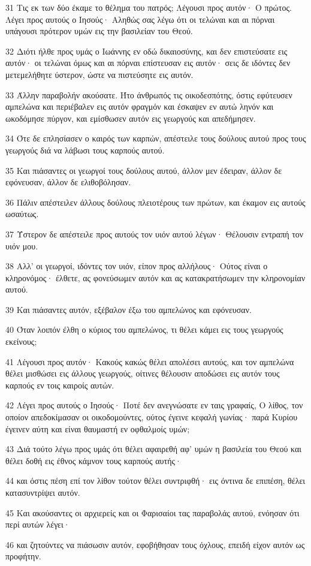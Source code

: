 \par 31 Τις εκ των δύο έκαμε το θέλημα του πατρός; Λέγουσι προς αυτόν· Ο πρώτος. Λέγει προς αυτούς ο Ιησούς· Αληθώς σας λέγω ότι οι τελώναι και αι πόρναι υπάγουσι πρότερον υμών εις την βασιλείαν του Θεού.
\par 32 Διότι ήλθε προς υμάς ο Ιωάννης εν οδώ δικαιοσύνης, και δεν επιστεύσατε εις αυτόν· οι τελώναι όμως και αι πόρναι επίστευσαν εις αυτόν· σεις δε ιδόντες δεν μετεμελήθητε ύστερον, ώστε να πιστεύσητε εις αυτόν.
\par 33 Άλλην παραβολήν ακούσατε. Ήτο άνθρωπός τις οικοδεσπότης, όστις εφύτευσεν αμπελώνα και περιέβαλεν εις αυτόν φραγμόν και έσκαψεν εν αυτώ ληνόν και ωκοδόμησε πύργον, και εμίσθωσεν αυτόν εις γεωργούς και απεδήμησεν.
\par 34 Ότε δε επλησίασεν ο καιρός των καρπών, απέστειλε τους δούλους αυτού προς τους γεωργούς διά να λάβωσι τους καρπούς αυτού.
\par 35 Και πιάσαντες οι γεωργοί τους δούλους αυτού, άλλον μεν έδειραν, άλλον δε εφόνευσαν, άλλον δε ελιθοβόλησαν.
\par 36 Πάλιν απέστειλεν άλλους δούλους πλειοτέρους των πρώτων, και έκαμον εις αυτούς ωσαύτως.
\par 37 Ύστερον δε απέστειλε προς αυτούς τον υιόν αυτού λέγων· Θέλουσιν εντραπή τον υιόν μου.
\par 38 Αλλ' οι γεωργοί, ιδόντες τον υιόν, είπον προς αλλήλους· Ούτος είναι ο κληρονόμος· έλθετε, ας φονεύσωμεν αυτόν και ας κατακρατήσωμεν την κληρονομίαν αυτού.
\par 39 Και πιάσαντες αυτόν, εξέβαλον έξω του αμπελώνος και εφόνευσαν.
\par 40 Όταν λοιπόν έλθη ο κύριος του αμπελώνος, τι θέλει κάμει εις τους γεωργούς εκείνους;
\par 41 Λέγουσι προς αυτόν· Κακούς κακώς θέλει απολέσει αυτούς, και τον αμπελώνα θέλει μισθώσει εις άλλους γεωργούς, οίτινες θέλουσιν αποδώσει εις αυτόν τους καρπούς εν τοις καιροίς αυτών.
\par 42 Λέγει προς αυτούς ο Ιησούς· Ποτέ δεν ανεγνώσατε εν ταις γραφαίς, Ο λίθος, τον οποίον απεδοκίμασαν οι οικοδομούντες, ούτος έγεινε κεφαλή γωνίας· παρά Κυρίου έγεινεν αύτη και είναι θαυμαστή εν οφθαλμοίς υμών;
\par 43 Διά τούτο λέγω προς υμάς ότι θέλει αφαιρεθή αφ' υμών η βασιλεία του Θεού και θέλει δοθή εις έθνος κάμνον τους καρπούς αυτής·
\par 44 και όστις πέση επί τον λίθον τούτον θέλει συντριφθή· εις όντινα δε επιπέση, θέλει κατασυντρίψει αυτόν.
\par 45 Και ακούσαντες οι αρχιερείς και οι Φαρισαίοι τας παραβολάς αυτού, ενόησαν ότι περί αυτών λέγει·
\par 46 και ζητούντες να πιάσωσιν αυτόν, εφοβήθησαν τους όχλους, επειδή είχον αυτόν ως προφήτην.

